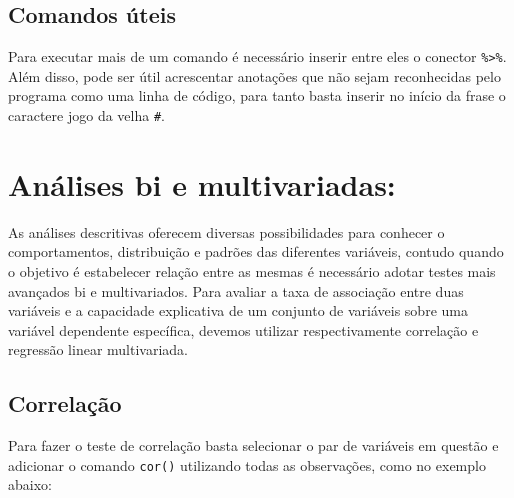 \documentclass[
  brazil,
]{book}
\newenvironment{Shaded}{\begin{snugshade}}{\end{snugshade}}
\newcommand{\CommentTok}[1]{\textcolor[rgb]{0.56,0.35,0.01}{\textit{#1}}}
\newcommand{\DataTypeTok}[1]{\textcolor[rgb]{0.13,0.29,0.53}{#1}}
\newcommand{\KeywordTok}[1]{\textcolor[rgb]{0.13,0.29,0.53}{\textbf{#1}}}
\newcommand{\NormalTok}[1]{#1}
\newcommand{\OperatorTok}[1]{\textcolor[rgb]{0.81,0.36,0.00}{\textbf{#1}}}
\newcommand{\OtherTok}[1]{\textcolor[rgb]{0.56,0.35,0.01}{#1}}
\newcommand{\StringTok}[1]{\textcolor[rgb]{0.31,0.60,0.02}{#1}}
\begin{document}
\hypertarget{comandos-uxfateis}{%
\subsection{Comandos úteis}\label{comandos-uxfateis}}

Para executar mais de um comando é necessário inserir entre eles o conector \texttt{\%\textgreater{}\%}. Além disso, pode ser útil acrescentar anotações que não sejam reconhecidas pelo programa como uma linha de código, para tanto basta inserir no início da frase o caractere jogo da velha \texttt{\#}.

\begin{Shaded}
\end{Shaded}

\hypertarget{anuxe1lises-bi-e-multivariadas}{%
\section{Análises bi e multivariadas:}\label{anuxe1lises-bi-e-multivariadas}}

As análises descritivas oferecem diversas possibilidades para conhecer o comportamentos, distribuição e padrões das diferentes variáveis, contudo quando o objetivo é estabelecer relação entre as mesmas é necessário adotar testes mais avançados bi e multivariados. Para avaliar a taxa de associação entre duas variáveis e a capacidade explicativa de um conjunto de variáveis sobre uma variável dependente específica, devemos utilizar respectivamente correlação e regressão linear multivariada.

\hypertarget{correlauxe7uxe3o}{%
\subsection{Correlação}\label{correlauxe7uxe3o}}

Para fazer o teste de correlação basta selecionar o par de variáveis em questão e adicionar o comando \texttt{cor()} utilizando todas as observações, como no exemplo abaixo:
\end{document}
